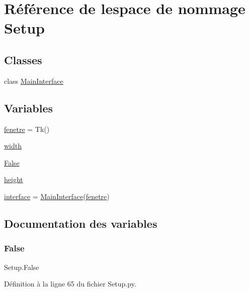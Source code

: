 \hypertarget{namespaceSetup}{}\section{Référence de l\textquotesingle{}espace de nommage Setup}
\label{namespaceSetup}
\subsection*{Classes}
\begin{DoxyCompactItemize}
\item 
class \hyperlink{classSetup_1_1MainInterface}{Main\+Interface}
\end{DoxyCompactItemize}
\subsection*{Variables}
\begin{DoxyCompactItemize}
\item 
\hyperlink{namespaceSetup_af395de35aeb7bf3d25e14620ec4bdc7e}{fenetre} = Tk()
\item 
\hyperlink{namespaceSetup_a399c4d17343f2647bc242ffe5f774c58}{width}
\item 
\hyperlink{namespaceSetup_adea4eaf3a9a5f7eafdd075f5eac8432d}{False}
\item 
\hyperlink{namespaceSetup_ae61abac3c4d5091fef21491962b7450f}{height}
\item 
\hyperlink{namespaceSetup_a1f55b250260065e5026241cc21093628}{interface} = \hyperlink{classSetup_1_1MainInterface}{Main\+Interface}(\hyperlink{namespaceSetup_af395de35aeb7bf3d25e14620ec4bdc7e}{fenetre})
\end{DoxyCompactItemize}


\subsection{Documentation des variables}
\mbox{\label{namespaceSetup_adea4eaf3a9a5f7eafdd075f5eac8432d}} 
\subsubsection{\texorpdfstring{False}{False}}
{\footnotesize\ttfamily Setup.\+False}



Définition à la ligne 65 du fichier Setup.\+py.

